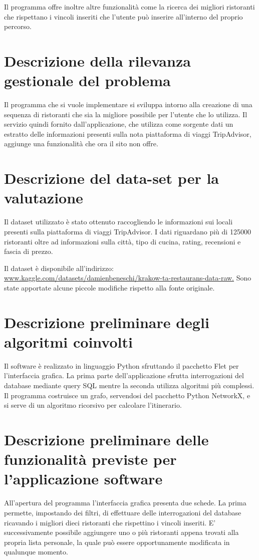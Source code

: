 \documentclass{report}
\begin{document}
Il programma offre inoltre altre funzionalità come la ricerca dei migliori ristoranti che rispettano i vincoli inseriti che l'utente può inserire all'interno del proprio percorso.

\section{Descrizione della rilevanza gestionale del problema}\label{sec_rilevanza}
Il programma che si vuole implementare si sviluppa intorno alla creazione di una sequenza di ristoranti che sia la migliore possibile per l'utente che lo utilizza. Il servizio quindi fornito dall'applicazione, che utilizza come sorgente dati un estratto delle informazioni presenti sulla nota piattaforma di viaggi TripAdvisor, aggiunge una funzionalità che ora il sito non offre.  

\section{Descrizione del data-set per la valutazione}
Il dataset utilizzato è stato ottenuto raccogliendo le informazioni sui locali presenti sulla piattaforma di viaggi TripAdvisor. I dati riguardano più di 125000 ristoranti oltre ad informazioni sulla città, tipo di cucina, rating, recensioni e fascia di prezzo.

Il dataset è disponibile all'indirizzo: \hyperlink{www.kaggle.com/datasets/damienbeneschi/krakow-ta-restaurans-data-raw}{www.kaggle.com/datasets/damienbeneschi/krakow-ta-restaurans-data-raw.}
Sono state apportate alcune piccole modifiche rispetto alla fonte originale.

\section{Descrizione preliminare degli algoritmi coinvolti}\label{sec_algoritmi}
Il software è realizzato in linguaggio Python sfruttando il pacchetto Flet per l'interfaccia grafica.
La prima parte dell'applicazione sfrutta interrogazioni del database mediante query SQL mentre la seconda utilizza algoritmi più complessi. Il programma costruisce un grafo, servendosi del pacchetto Python NetworkX, e si serve di un algoritmo ricorsivo per calcolare l'itinerario.

\section{Descrizione preliminare delle funzionalità previste per l’applicazione software}\label{sec_funzionalità}
All'apertura del programma l'interfaccia grafica presenta due schede. 
La prima permette, impostando dei filtri, di effettuare delle interrogazioni del database ricavando i migliori dieci ristoranti che rispettino i vincoli inseriti. 
E' successivamente possibile aggiungere uno o più ristoranti appena trovati alla propria lista personale, la quale può essere opportunamente modificata in qualunque momento.
\end{document}
